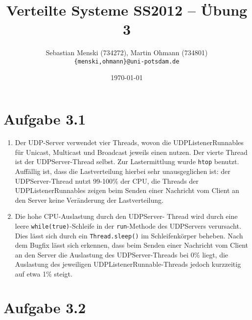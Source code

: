 \documentclass[german,12pt,a4paper]{article}
\begin{document}
\title{\textbf{Verteilte Systeme SS2012 -- Übung 3}}
\author{Sebastian Menski (734272), Martin Ohmann (734801) \\ \texttt{\{menski,ohmann\}@uni-potsdam.de}}
\date{\today}

\maketitle

\section*{Aufgabe 3.1}

\begin{enumerate}

	\item Der UDP-Server verwendet vier Threads, wovon die UDPListenerRunnables für Unicast, Multicast und Broadcast jeweils einen nutzen.
	Der vierte Thread ist der UDPServer-Thread selbst. Zur Lastermittlung wurde \texttt{htop} benutzt. Auffällig ist, dass die Lastverteilung hierbei sehr unausgeglichen ist: der UDPServer-Thread nutzt 99-100\% 
	der CPU, die Threads der UDPListenerRunnables zeigen beim Senden einer Nachricht vom Client an den Server keine Veränderung der Lastverteilung.
	
	\item Die hohe CPU-Auslastung durch den UDPServer- Thread wird durch eine leere \texttt{while(true)}-Schleife in der \texttt{run}-Methode des UDPServers verursacht. 
	Dies lässt sich durch ein \texttt{Thread.sleep()} im Schleifenkörper beheben. Nach dem Bugfix lässt sich erkennen, dass beim Senden einer Nachricht vom Client an den Server die Auslastung des UDPServer-Threads bei 
	0\% liegt, die Auslastung des jeweiligen UDPListenerRunnable-Threads jedoch kurzzeitig auf etwa 1\% steigt.

\end{enumerate}

\section*{Aufgabe 3.2}
\end{document}
